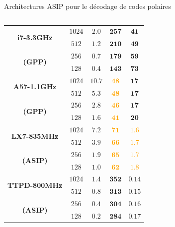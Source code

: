 \documentclass[t,compress,mathserif,12pt,xcolor=dvipsnames]{beamer}
\newcommand{\RED} [1]{\textcolor{Paired-5}{\textbf{#1}}}
\newcommand{\ORANGE} [1]{\textcolor{orange}{\textbf{#1}}}
\newcommand{\GREEN} [1]{\textcolor{Paired-3}{\textbf{#1}}}
\begin{document}
\begin{frame}[t]{Architectures ASIP pour le décodage de codes polaires}
\begin{minipage}[t][5.0cm][t]{\textwidth}
\begin{columns}[T]
\begin{column}{0.40\textwidth}
{\begin{table}
{{\begin{tabular}{c|c|c|c|c}
        \multirow{2}{*}{\bf i7-3.3GHz}              & $1024$   & $2.0$  & \GREEN{$\mathbf{257}$} & \RED{$\mathbf{41}$}   \\
                                                    & $512$    & $1.2$  & \GREEN{$\mathbf{210}$} & \RED{$\mathbf{49}$}   \\
        \multirow{2}{*}{\bf (GPP)}                  & $256$    & $0.7$  & \GREEN{$\mathbf{179}$} & \RED{$\mathbf{59}$}   \\
                                                    & $128$    & $0.4$  & \GREEN{$\mathbf{143}$} & \RED{$\mathbf{73}$}   \\
        \midrule
        \multirow{2}{*}{\bf A57-1.1GHz}             & $1024$   & $10.7$ & \ORANGE{$\mathbf{48}$} & \RED{$\mathbf{17}$}   \\
                                                    & $512$    & $5.3$  & \ORANGE{$\mathbf{48}$} & \RED{$\mathbf{17}$}   \\
        \multirow{2}{*}{\bf (GPP)}                  & $256$    & $2.8$  & \ORANGE{$\mathbf{46}$} & \RED{$\mathbf{17}$}   \\
                                                    & $128$    & $1.6$  & \ORANGE{$\mathbf{41}$} & \RED{$\mathbf{20}$}   \\
        \midrule
        \multirow{2}{*}{\bf LX7-835MHz}             & $1024$   & $7.2$  & \ORANGE{$\mathbf{71}$} & \ORANGE{$\mathbf{1.6}$}  \\
                                                    & $512$    & $3.9$  & \ORANGE{$\mathbf{66}$} & \ORANGE{$\mathbf{1.7}$}  \\
        \multirow{2}{*}{\bf (ASIP)}                 & $256$    & $1.9$  & \ORANGE{$\mathbf{65}$} & \ORANGE{$\mathbf{1.7}$}  \\
                                                    & $128$    & $1.0$  & \ORANGE{$\mathbf{62}$} & \ORANGE{$\mathbf{1.8}$}  \\
        \midrule
        \multirow{2}{*}{\bf TTPD-800MHz}            & $1024$   & $1.4$  & \GREEN{$\mathbf{352}$} & \GREEN{$\mathbf{0.14}$} \\ %
                                                    & $512$    & $0.8$  & \GREEN{$\mathbf{313}$} & \GREEN{$\mathbf{0.15}$} \\ %
        \multirow{2}{*}{\bf (ASIP)}                 & $256$    & $0.4$  & \GREEN{$\mathbf{304}$} & \GREEN{$\mathbf{0.16}$} \\ %
                                                    & $128$    & $0.2$  & \GREEN{$\mathbf{284}$} & \GREEN{$\mathbf{0.17}$} \\ %


\end{tabular}}}
\end{table}}
\end{column}
\end{columns}
\end{minipage}
\end{frame}
\end{document}
